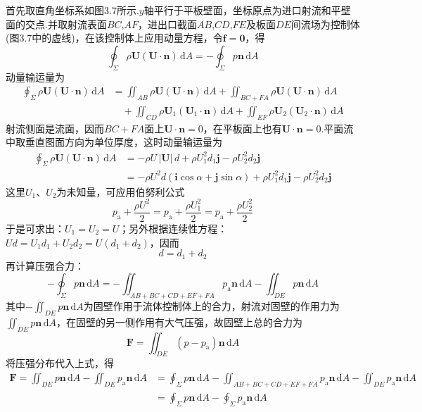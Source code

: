 首先取直角坐标系如图3.7所示.$y$轴平行于平板壁面，坐标原点为进口射流和平壁面的交点.并取射流表面$BC$,$AF$，进出口截面$AB$,$CD$,$FE$及板面$DE$间流场为控制体(图3.7中的虚线)，在该控制体上应用动量方程，令$\boldsymbol{f}=\boldsymbol{0}$，得
\[
\oint_\Sigma \rho\boldsymbol{U}(\boldsymbol{U}\cdot\boldsymbol{n})\,\mathrm{d}A=-\oint_\Sigma p\boldsymbol{n}\,\mathrm{d}A
\]
动量输运量为
\begin{align*}
\oint_\Sigma \rho\boldsymbol{U}(\boldsymbol{U}\cdot\boldsymbol{n})\,\mathrm{d}A&=\iint_{AB}\rho\boldsymbol{U}(\boldsymbol{U}\cdot\boldsymbol{n})\,\mathrm{d}A+\iint_{BC+FA}\rho\boldsymbol{U}(\boldsymbol{U}\cdot\boldsymbol{n})\,\mathrm{d}A\\
&\quad+\iint_{CD}\rho\boldsymbol{U}_1(\boldsymbol{U}_1\cdot\boldsymbol{n})\,\mathrm{d}A+\iint_{EF}\rho\boldsymbol{U}_2(\boldsymbol{U}_2\cdot\boldsymbol{n})\,\mathrm{d}A
\end{align*}
射流侧面是流面，因而$BC+FA$面上$\boldsymbol{U}\cdot\boldsymbol{n}=0$，在平板面上也有$\boldsymbol{U}\cdot\boldsymbol{n}=0$.平面流中取垂直图面方向为单位厚度，这时动量输运量为
\begin{align*}
\oint_\Sigma \rho\boldsymbol{U}(\boldsymbol{U}\cdot\boldsymbol{n})\,\mathrm{d}A&=-\rho U\,|\boldsymbol{U}|\,d+\rho U_1^{2}d_1\boldsymbol{j}-\rho U_2^{2}d_2\boldsymbol{j}\\
&=-\rho U^{2}d(\boldsymbol{i}\cos\alpha+\boldsymbol{j}\sin\alpha)+\rho U_1^{2}d_1\boldsymbol{j}-\rho U_2^{2}d_2\boldsymbol{j}
\end{align*}
这里$U_1$、$U_2$为未知量，可应用伯努利公式
\[
p_{\mathrm{a}}+\frac{\rho U^{2}}{2}=p_{\mathrm{a}}+\frac{\rho U_1^{2}}{2}=p_{\mathrm{a}}+\frac{\rho U_2^{2}}{2}
\]
于是可求出：$U_1=U_2=U$；另外根据连续性方程：$Ud=U_1d_1+U_2d_2=U(d_1+d_2)$，因而
\[
d=d_1+d_2
\]
再计算压强合力：
\[
-\oint_\Sigma p\boldsymbol{n}\,\mathrm{d}A=-\iint_{AB+BC+CD+EF+FA}p_{\mathrm{a}}\boldsymbol{n}\,\mathrm{d}A-\iint_{DE}p\boldsymbol{n}\,\mathrm{d}A
\]
其中$-\displaystyle\iint_{DE}p\boldsymbol{n}\,\mathrm{d}A$为固壁作用于流体控制体上的合力，射流对固壁的作用力为$\displaystyle\iint_{DE}p\boldsymbol{n}\,\mathrm{d}A$，在固壁的另一侧作用有大气压强，故固壁上总的合力为
\[
\boldsymbol{F}=\iint_{DE}(p-p_{\mathrm{a}})\boldsymbol{n}\,\mathrm{d}A
\]
将压强分布代入上式，得
\begin{align*}
\boldsymbol{F}=\iint_{DE}p\boldsymbol{n}\,\mathrm{d}A-\iint_{DE}p_{\mathrm{a}}\boldsymbol{n}\,\mathrm{d}A&=\oint_\Sigma p\boldsymbol{n}\,\mathrm{d}A-\iint_{AB+BC+CD+EF+FA}p_{\mathrm{a}}\boldsymbol{n}\,\mathrm{d}A-\iint_{DE}p_{\mathrm{a}}\boldsymbol{n}\,\mathrm{d}A\\
&=\oint_\Sigma p\boldsymbol{n}\,\mathrm{d}A-\oint_\Sigma p_{\mathrm{a}}\boldsymbol{n}\,\mathrm{d}A
\end{align*}
